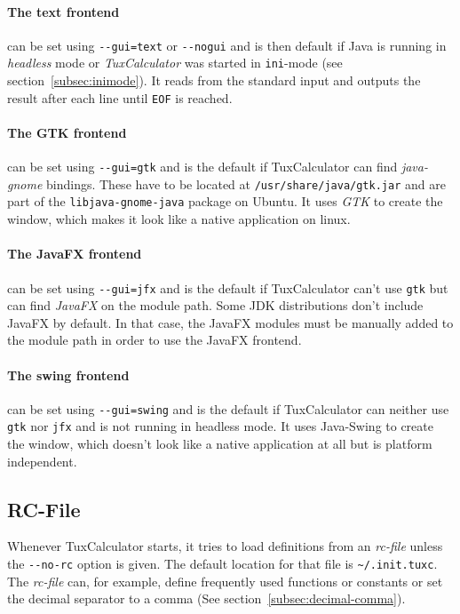 \documentclass[10pt]{article}
\let\~=\allowbreak
\begin{document}
    \paragraph{The text frontend} can be set using \verb|--gui=text| or \verb|--nogui| and is then default if Java is running in \textsl{headless} mode or \textit{TuxCalculator} was started in \verb|ini|-mode (see section~\ref{subsec:inimode}).
    It reads from the standard input and outputs the result after each line until \verb|EOF| is reached.
    
    \paragraph{The GTK frontend} can be set using \verb|--gui=gtk| and is the default if TuxCalculator can find \textsl{java-gnome} bindings.
    These have to be located at \texttt{/usr\~/share\~/java\~/gtk.jar} and are part of the \texttt{libjava-\~gnome-\~java} package on Ubuntu.
    It uses \textsl{GTK} to create the window, which makes it look like a native application on linux.
    
    \paragraph{The JavaFX frontend} can be set using \verb|--gui=jfx| and is the default if TuxCalculator can't use \verb|gtk| but can find \textsl{JavaFX} on the module path.
    Some JDK distributions don't include JavaFX by default.
    In that case, the JavaFX modules must be manually added to the module path in order to use the JavaFX frontend.
    
    \paragraph{The swing frontend} can be set using \verb|--gui=swing| and is the default if TuxCalculator can neither use \verb|gtk| nor \verb|jfx| and is not running in headless mode.
    It uses Java-Swing to create the window, which doesn't look like a native application at all but is platform independent.
    
    \subsection{RC-File}\label{subsec:rcfile}
    Whenever TuxCalculator starts, it tries to load definitions from an \textit{rc-file} unless the \verb|--no-rc| option is given.
    The default location for that file is \verb|~/.init.tuxc|.
    The \textit{rc-file} can, for example, define frequently used functions or constants or set the decimal separator to a comma (See section~\ref{subsec:decimal-comma}).
\end{document}
